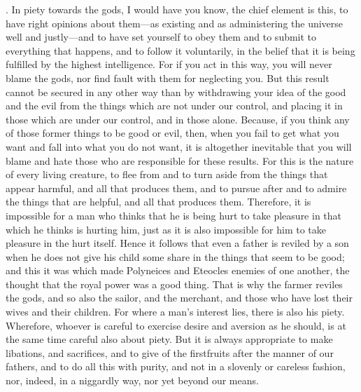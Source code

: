 . In piety towards the gods, I would have you know, the chief element is this, to have right opinions about them—as existing and as administering the universe well and justly—and to have set yourself to obey them and to submit to everything that happens, and to follow it voluntarily, in the belief that it is being fulfilled by the highest intelligence. For if you act in this way, you will never blame the gods, nor find fault with them for neglecting you. But this result cannot be secured in any other way than by withdrawing your idea of the good and the evil from the things which are not under our control, and placing it in those which are under our control, and in those alone. Because, if you think any of those former things to be good or evil, then, when you fail to get what you want and fall into what you do not want, it is altogether inevitable that you will blame and hate those who are responsible for these results. For this is the nature of every living creature, to flee from and to turn aside from the things that appear harmful, and all that produces them, and to pursue after and to admire the things that are helpful, and all that produces them. Therefore, it is impossible for a man who thinks that he is being hurt to take pleasure in that which he thinks is hurting him, just as it is also impossible for him to take pleasure in the hurt itself. Hence it follows that even a father is reviled by a son when he does not give his child some share in the things that seem to be good; and this it was which made Polyneices and Eteocles enemies of one another, the thought that the royal power was a good thing. That is why the farmer reviles the gods, and so also the sailor, and the merchant, and those who have lost their wives and their children. For where a man's interest lies, there is also his piety. Wherefore, whoever is careful to exercise desire and aversion as he should, is at the same time careful also about piety. But it is always appropriate to make libations, and sacrifices, and to give of the firstfruits after the manner of our fathers, and to do all this with purity, and not in a slovenly or careless fashion, nor, indeed, in a niggardly way, nor yet beyond our means.

